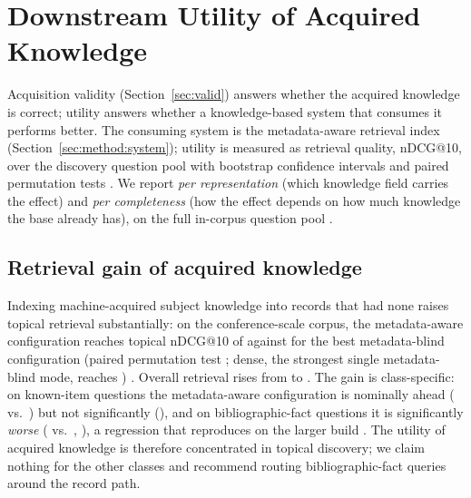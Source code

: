 
\section{Downstream Utility of Acquired Knowledge}
\label{sec:util}

Acquisition validity (Section~\ref{sec:valid}) answers whether the acquired
knowledge is correct; utility answers whether a knowledge-based system that
consumes it performs better. The consuming system is the metadata-aware
retrieval index (Section~\ref{sec:method:system}); utility is measured as
retrieval quality, nDCG@10, over the discovery question pool with bootstrap
confidence intervals and paired permutation tests \cite{ndcg}. We report
\emph{per representation} (which knowledge field carries the effect) and
\emph{per completeness} (how the effect depends on how much knowledge the
base already has), on the full in-corpus question pool
.

\subsection{Retrieval gain of acquired knowledge}

Indexing machine-acquired subject knowledge into records that had none
raises topical retrieval substantially: on the conference-scale corpus,
the metadata-aware configuration reaches topical nDCG@10 of
\TopicalMeta{} against \TopicalHybrid{} for the best metadata-blind
configuration (paired permutation test \TopicalP{}; dense, the strongest
single metadata-blind mode, reaches \TopicalDense{})
. Overall retrieval rises from
\OverallHybrid{} to \OverallMeta{}. The gain is class-specific: on
known-item questions the metadata-aware configuration is nominally ahead
(\KnownMeta{} vs.\ \KnownHybrid{}) but not significantly (\KnownP{}),
and on bibliographic-fact questions it is significantly \emph{worse}
(\BibMeta{} vs.\ \BibHybrid{}, \BibP{}), a regression that reproduces on
the larger build . The
utility of acquired knowledge is therefore concentrated in topical
discovery; we claim nothing for the other classes and recommend routing
bibliographic-fact queries around the record path.

